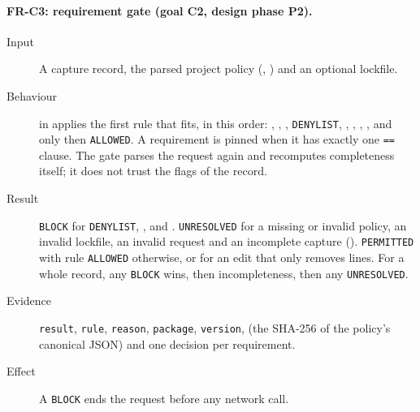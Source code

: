 \paragraph{FR-C3: requirement gate (goal C2, design phase P2).}
\begin{sloppypar}
\begin{description}
    \item[Input] A capture record, the parsed project policy (, ) and an optional lockfile.
    \item[Behaviour]  in  applies the first rule that fits, in this order: , , , \texttt{DENYLIST}, , , , , and only then \texttt{ALLOWED}. A requirement is pinned when it has exactly one \texttt{==} clause. The gate parses the request again and recomputes completeness itself; it does not trust the flags of the record.
    \item[Result] \texttt{BLOCK} for \texttt{DENYLIST}, ,  and . \texttt{UNRESOLVED} for a missing or invalid policy, an invalid lockfile, an invalid request and an incomplete capture (). \texttt{PERMITTED} with rule \texttt{ALLOWED} otherwise, or  for an edit that only removes lines. For a whole record, any \texttt{BLOCK} wins, then incompleteness, then any \texttt{UNRESOLVED}.
    \item[Evidence] \texttt{result}, \texttt{rule}, \texttt{reason}, \texttt{package}, \texttt{version},  (the SHA-256 of the policy's canonical JSON) and one decision per requirement.
    \item[Effect] A \texttt{BLOCK} ends the request before any network call.
\end{description}
\end{sloppypar}

